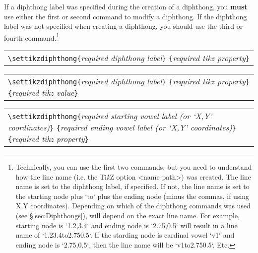 \documentclass{article}
\newcommand{\TikZ}{Ti\textit{k}Z\xspace}
\def\\{}%
\def\texttt#1{<#1>}%
\begin{document}
If a diphthong label was specified during the creation of a diphthong, you \textbf{\large must} use either the first or second command to modify a diphthong.  If the diphthong label was not specified when creating a diphthong, you should use the third or fourth command.\footnote{Technically, you can use the first two commands, but you need to understand how the line name (i.e. the \TikZ option \texttt{name path}) was created.  The line name is set to the diphthong label, if specified.  If not, the line name is set to the starting node plus `to` plus the ending node (minus the commas, if using X,Y coordinates).  Depending on which of the diphthong commands was used (see \S \ref{sec:Diphthongs}), will depend on the exact line name.  For example, starting node is `1.2,3.4` and ending node is `2.75,0.5` will result in a line name of `1.23.4to2.750.5`.  If the starding node is cardinal vowel `v1` and ending node is `2.75,0.5`, then the line name will be `v1to2.750.5`.  Etc.}
\begin{center}
	\begin{tabular}{l}
		\begin{minipage}[t]{0.85\textwidth}
			{\small
				\verb|\settikzdiphthong{|\textit{required diphthong label}\verb|}|\\
				\hspace*{9.5em}\verb|{|\textit{required tikz property}\verb|}|
			}
		\end{minipage} \\
	\end{tabular}
\end{center}
\begin{center}
	\begin{tabular}{l}
		\begin{minipage}[t]{0.85\textwidth}
			{\small
				\verb|\settikzdiphthong{|\textit{required diphthong label}\verb|}|\\
				\hspace*{9.5em}\verb|{|\textit{required tikz property}\verb|}|\\
				\hspace*{9.5em}\verb|{|\textit{required tikz value}\verb|}|
			}
		\end{minipage} \\
	\end{tabular}
\end{center}
\begin{center}
	\begin{tabular}{l}
		\begin{minipage}[t]{0.85\textwidth}
			{\small
				\verb|\settikzdiphthong{|\textit{required starting vowel label (or `X,Y' coordinates)}\verb|}|\\
				\hspace*{9.5em}\verb|{|\textit{required ending vowel label (or `X,Y' coordinates)}\verb|}|\\
				\hspace*{9.5em}\verb|{|\textit{required tikz property}\verb|}|
			}
		\end{minipage} \\
	\end{tabular}
\end{center}
\end{document}
